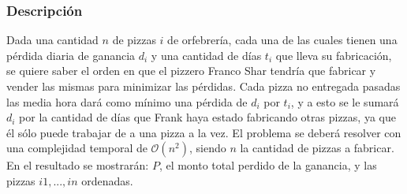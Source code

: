 \documentclass[11pt, a4paper, twoside]{article}
\begin{document}
{}

\subsubsection{Descripción}

Dada una cantidad $n$ de pizzas $i$ de orfebrería, cada una de las cuales tienen
una pérdida diaria de ganancia $d_i$ y una cantidad de días $t_i$ que lleva su
fabricación, se quiere saber el orden en que el pizzero Franco Shar tendría que
fabricar y vender las mismas para minimizar las pérdidas. Cada pizza no
entregada pasadas las media hora dará como mínimo una pérdida de $d_i$ por
$t_i$, y a esto se le sumará $d_i$ por la cantidad de días que Frank haya estado
fabricando otras pizzas, ya que él sólo puede trabajar de a una pizza a la vez.
El problema se deberá resolver con una complejidad temporal de
$\mathcal{O}(n^{2})$, siendo $n$ la cantidad de pizzas a fabricar. En el
resultado se mostrarán: $P$, el monto total perdido de la ganancia, y las pizzas
$i1,...,in$ ordenadas.
\end{document}
